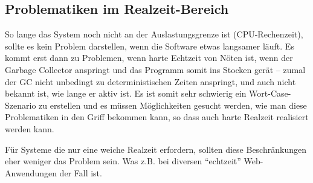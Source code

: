 \subsection{Problematiken im Realzeit-Bereich}


So lange das System noch nicht an der Auslastungsgrenze ist (CPU-Rechenzeit),
sollte es kein Problem darstellen, wenn die Software etwas langsamer läuft.
Es kommt erst dann zu Problemen, wenn harte Echtzeit von Nöten ist, wenn der
Garbage Collector anspringt und das Programm somit ins Stocken gerät -- zumal
der GC nicht unbedingt zu deterministischen Zeiten anspringt, und auch nicht
bekannt ist, wie lange er aktiv ist. Es ist somit sehr schwierig ein
Wort-Case-Szenario zu erstellen und es müssen Möglichkeiten gesucht werden,
wie man diese Problematiken in den Griff bekommen kann, so dass auch harte
Realzeit realisiert werden kann.


Für Systeme die nur eine weiche Realzeit erfordern, sollten diese
Beschränkungen eher weniger das Problem sein. Was z.B. bei diversen 
"`echtzeit"' Web-Anwendungen der Fall ist.
